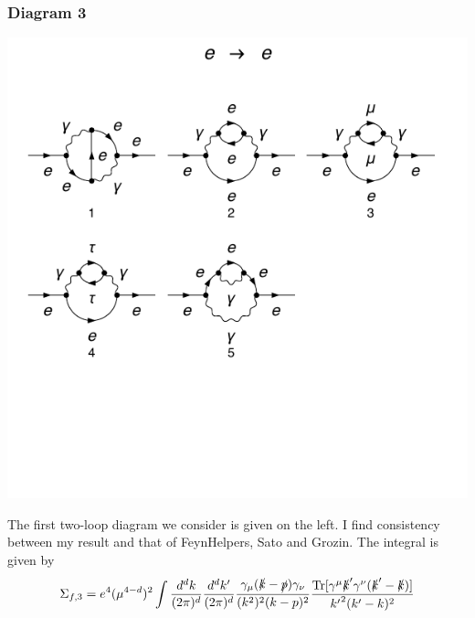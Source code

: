 \documentclass[11pt]{article}
\begin{document}
\subsubsection{Diagram 3}
\noindent\begin{minipage}{0.3\textwidth}
\begin{center}
\includegraphics{QED_F_2loop_2.pdf}
\end{center}
\end{minipage}
\noindent\begin{minipage}{0.7\textwidth}
The first two-loop diagram we consider is given on the left.  I find consistency between my result and that of FeynHelpers, Sato and Grozin.  The integral is given by \cite{Sato2013}
\begin{align}
\Sigma_{f,3} = e^4 (\mu^{4-d})^2 \int \frac{d^dk}{(2\pi)^d}  \frac{d^dk'}{(2\pi)^d} \frac{\gamma_{\mu}(\slashed{k}-\slashed{p})\gamma_{\nu}}{(k^2)^2(k-p)^2} \frac{\text{Tr}[\gamma^{\mu}\slashed{k}'\gamma^{\nu}(\slashed{k}'-\slashed{k})]}{ {k'}^2 (k'-k)^2}
\end{align}
\end{minipage}
\end{document}
